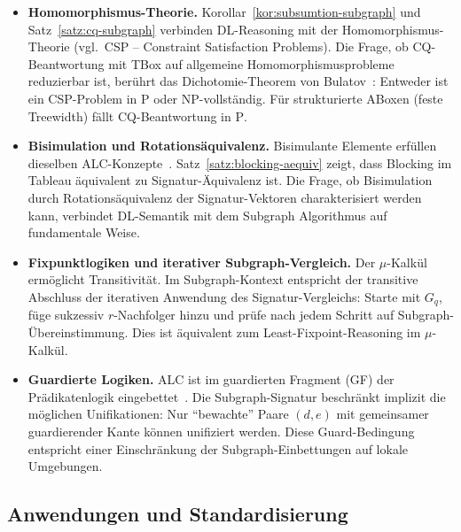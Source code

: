 ﻿\documentclass[a4paper,12pt]{article}
\theoremstyle{definition}
\theoremstyle{plain}
\theoremstyle{remark}
\begin{document}
\begin{itemize}
  \item \textbf{Homomorphismus-Theorie.}
        Korollar~\ref{kor:subsumtion-subgraph} und Satz~\ref{satz:cq-subgraph}
        verbinden DL-Reasoning mit der Homomorphismus-Theorie
        (vgl.\ CSP -- Constraint Satisfaction Problems).
        Die Frage, ob CQ-Beantwortung mit TBox auf allgemeine
        Homomorphismusprobleme reduzierbar ist, ber{\"u}hrt
        das Dichotomie-Theorem von Bulatov~\cite{Bulatov2017}:
        Entweder ist ein CSP-Problem in \textsc{P} oder \textsc{NP}-vollst{\"a}ndig.
        F{\"u}r strukturierte ABoxen (feste Treewidth) f{\"a}llt
        CQ-Beantwortung in \textsc{P}.

  \item \textbf{Bisimulation und Rotations{\"a}quivalenz.}
        Bisimulante Elemente erf{\"u}llen dieselben \textsf{ALC}-Konzepte~\cite{Blackburn2001}.
        Satz~\ref{satz:blocking-aequiv} zeigt, dass Blocking im
        Tableau {\"a}quivalent zu Signatur-{\"A}quivalenz ist.
        Die Frage, ob Bisimulation durch Rotations{\"a}quivalenz der
        Signatur-Vektoren charakterisiert werden kann, verbindet
        DL-Semantik mit dem Subgraph Algorithmus auf fundamentale Weise.

  \item \textbf{Fixpunktlogiken und iterativer Subgraph-Vergleich.}
        Der $\mu$-Kalk{\"u}l erm{\"o}glicht Transitivit{\"a}t.
        Im Subgraph-Kontext entspricht der transitive Abschluss
        der iterativen Anwendung des Signatur-Vergleichs:
        Starte mit $G_q$, f{\"u}ge sukzessiv $r$-Nachfolger hinzu
        und pr{\"u}fe nach jedem Schritt auf Subgraph-{\"U}bereinstimmung.
        Dies ist {\"a}quivalent zum Least-Fixpoint-Reasoning im $\mu$-Kalk{\"u}l.

  \item \textbf{Guardierte Logiken.}
        \textsf{ALC} ist im guardierten Fragment (GF) der
        Pr{\"a}dikatenlogik eingebettet~\cite{Gradel1999}.
        Die Subgraph-Signatur beschr{\"a}nkt implizit die m{\"o}glichen
        Unifikationen: Nur ``bewachte'' Paare $(d, e)$ mit
        gemeinsamer guardierender Kante k{\"o}nnen unifiziert werden.
        Diese Guard-Bedingung entspricht einer Einschr{\"a}nkung
        der Subgraph-Einbettungen auf lokale Umgebungen.
\end{itemize}

\subsection{Anwendungen und Standardisierung}
\end{document}
